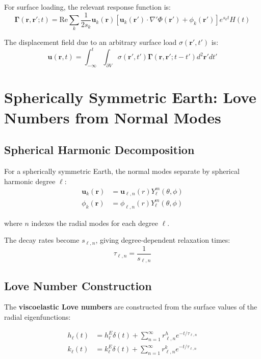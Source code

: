 \documentclass{article}
\begin{document}
For surface loading, the relevant response function is:
\begin{equation}
\boldsymbol{\Gamma}(\mathbf{r}, \mathbf{r}'; t) = \text{Re} \sum_k \frac{1}{2s_k} \mathbf{u}_k(\mathbf{r})[\mathbf{u}_k(\mathbf{r}') \cdot \nabla' \Phi(\mathbf{r}') + \phi_k(\mathbf{r}')] e^{s_k t} H(t)
\end{equation}

The displacement field due to an arbitrary surface load $\sigma(\mathbf{r}', t')$ is:
\begin{equation}
\mathbf{u}(\mathbf{r}, t) = \int_{-\infty}^t \int_{\partial V} \sigma(\mathbf{r}', t') \boldsymbol{\Gamma}(\mathbf{r}, \mathbf{r}'; t-t') d^2\mathbf{r}' dt'
\end{equation}

\section{Spherically Symmetric Earth: Love Numbers from Normal Modes}

\subsection{Spherical Harmonic Decomposition}

For a spherically symmetric Earth, the normal modes separate by spherical harmonic degree $\ell$:
\begin{align}
\mathbf{u}_k(\mathbf{r}) &= \mathbf{u}_{\ell,n}(r) Y_\ell^m(\theta, \phi) \\
\phi_k(\mathbf{r}) &= \phi_{\ell,n}(r) Y_\ell^m(\theta, \phi)
\end{align}

where $n$ indexes the radial modes for each degree $\ell$.

The decay rates become $s_{\ell,n}$, giving degree-dependent relaxation times:
\begin{equation}
\tau_{\ell,n} = \frac{1}{s_{\ell,n}}
\end{equation}

\subsection{Love Number Construction}

The \textbf{viscoelastic Love numbers} are constructed from the surface values of the radial eigenfunctions:

\begin{align}
h_\ell(t) &= h_\ell^E \delta(t) + \sum_{n=1}^{\infty} r_{\ell,n}^h e^{-t/\tau_{\ell,n}} \\
k_\ell(t) &= k_\ell^E \delta(t) + \sum_{n=1}^{\infty} r_{\ell,n}^k e^{-t/\tau_{\ell,n}}
\end{align}
\end{document}
